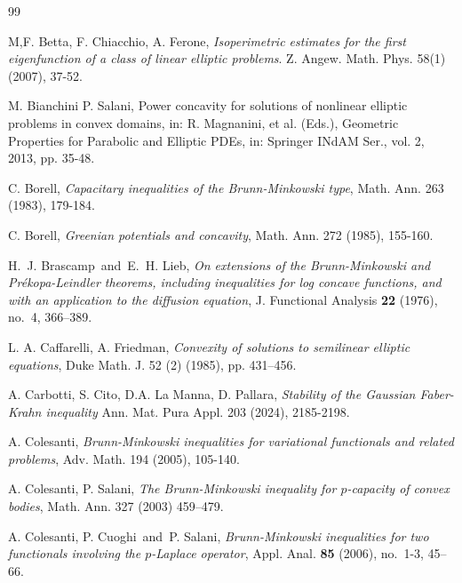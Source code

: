 \documentclass[12pt]{amsart}
\newcommand{\1}{\mathbf 1}
\begin{document}
\begin{thebibliography}{99}

 M,F. Betta, F. Chiacchio, A. Ferone, \emph{Isoperimetric estimates for the first eigenfunction of a class of
linear elliptic problems}. Z. Angew. Math. Phys. 58(1)  (2007), 37-52.

 M. Bianchini P. Salani, Power concavity for solutions of nonlinear elliptic problems in convex domains, in: R. Magnanini, et al. (Eds.), Geometric Properties for Parabolic and Elliptic PDEs, in: Springer INdAM Ser., vol. 2, 2013, pp. 35-48.

 C. Borell, \emph{Capacitary inequalities of the Brunn-Minkowski type}, Math. Ann. 263 (1983), 179-184.

 C. Borell, \emph{Greenian potentials and concavity}, Math.
Ann. 272 (1985), 155-160.

H.~J. Brascamp\ and\ E.~H. Lieb, {\em On extensions of the Brunn-Minkowski and Pr\'{e}kopa-Leindler theorems, including inequalities for log concave functions, and with an application to the diffusion equation}, J. Functional Analysis {\bf 22} (1976), no.~4, 366--389.

 L. A. Caffarelli, A. Friedman, {\it Convexity of solutions to semilinear elliptic equations}, Duke Math. J. 52 (2) (1985), pp. 431--456.


 A. Carbotti, S. Cito, D.A. La Manna, D. Pallara, \emph{Stability of the Gaussian Faber-Krahn inequality} Ann. Mat. Pura Appl. 203 (2024), 2185-2198.

 A. Colesanti, {\it Brunn-Minkowski inequalities for variational functionals and related problems}, Adv. Math. 194 (2005), 105-140.

 A. Colesanti, P. Salani, {\it The Brunn-Minkowski inequality for $p$-capacity of convex bodies}, Math. Ann. 327 (2003) 459--479.

A. Colesanti, P. Cuoghi\ and\ P. Salani, {\em Brunn-Minkowski inequalities for two functionals involving the $p$-Laplace operator}, Appl. Anal. {\bf 85} (2006), no.~1-3, 45--66.


\end{thebibliography}
\end{document}
